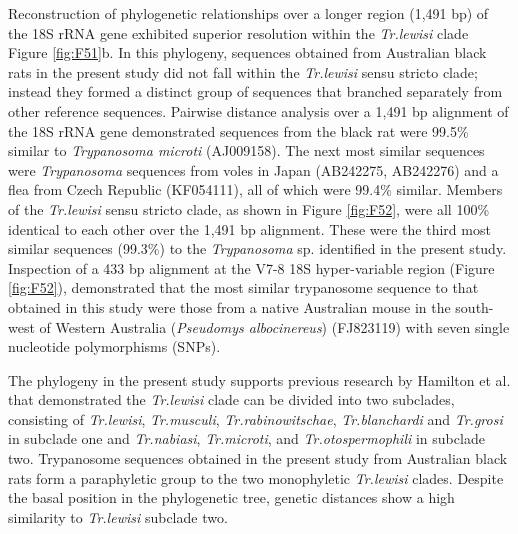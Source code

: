 \documentclass[a4paper, nobind]{templates/ociamthesis}
\begin{document}
Reconstruction of phylogenetic relationships over a longer region (1,491 bp) of the 18S rRNA gene exhibited superior resolution within the \emph{Tr.lewisi} clade Figure \ref{fig:F51}b. In this phylogeny, sequences obtained from Australian black rats in the present study did not fall within the \emph{Tr.lewisi} sensu stricto clade; instead they formed a distinct group of sequences that branched separately from other reference sequences. Pairwise distance analysis over a 1,491 bp alignment of the 18S rRNA gene demonstrated sequences from the black rat were 99.5\% similar to \emph{Trypanosoma microti} (AJ009158). The next most similar sequences were \emph{Trypanosoma} sequences from voles in Japan (AB242275, AB242276) and a flea from Czech Republic (KF054111), all of which were 99.4\% similar. Members of the \emph{Tr.lewisi} sensu stricto clade, as shown in Figure \ref{fig:F52}, were all 100\% identical to each other over the 1,491 bp alignment. These were the third most similar sequences (99.3\%) to the \emph{Trypanosoma} sp. identified in the present study. Inspection of a 433 bp alignment at the V7-8 18S hyper-variable region (Figure \ref{fig:F52}), demonstrated that the most similar trypanosome sequence to that obtained in this study were those from a native Australian mouse in the south-west of Western Australia (\emph{Pseudomys albocinereus}) (FJ823119) with seven single nucleotide polymorphisms (SNPs).

The phylogeny in the present study supports previous research by Hamilton et al. \autocite*{hamiltonInadvertentIntroductionAustralia2005} that demonstrated the \emph{Tr.lewisi} clade can be divided into two subclades, consisting of \emph{Tr.lewisi}, \emph{Tr.musculi}, \emph{Tr.rabinowitschae}, \emph{Tr.blanchardi} and \emph{Tr.grosi} in subclade one and \emph{Tr.nabiasi}, \emph{Tr.microti}, and \emph{Tr.otospermophili} in subclade two. Trypanosome sequences obtained in the present study from Australian black rats form a paraphyletic group to the two monophyletic \emph{Tr.lewisi} clades. Despite the basal position in the phylogenetic tree, genetic distances show a high similarity to \emph{Tr.lewisi} subclade two.
\end{document}
